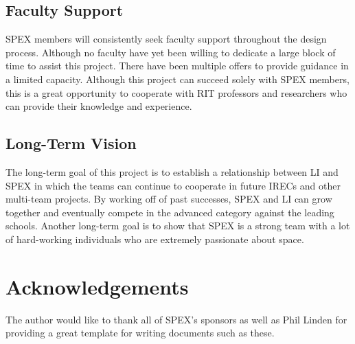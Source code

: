 \documentclass[conference]{IEEEtran} %
\begin{document}
\subsection{Faculty Support}
\label{subsec:Faculty Support}
SPEX members will consistently seek faculty support throughout the design process. Although no faculty have yet been willing to dedicate a
large block of time to assist this project. There have been multiple offers to provide guidance in a limited capacity. Although this project can succeed solely
with SPEX members, this is a great opportunity to cooperate with RIT professors and researchers who can provide their knowledge and experience.

\subsection{Long-Term Vision}
\label{sec:Long-Term Vision}
The long-term goal of this project is to establish a relationship between LI and SPEX in which the teams can continue to cooperate
in future IRECs and other multi-team projects. By working off of past successes, SPEX and LI can grow together and eventually compete in the
advanced category against the leading schools. Another long-term goal is to show that SPEX is a strong team with a lot of hard-working
individuals who are extremely passionate about space.

\section*{Acknowledgements}
\label{subsec:Acknoledgements}
The author would like to thank all of SPEX's sponsors as well as Phil Linden for providing a great template for writing documents such as these.
\onecolumn
\appendices{}
\end{document}

